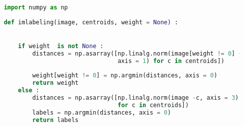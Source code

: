 	\lstset{style=python}
	\begin{lstlisting}[language=python, caption=imlabeling, label=code:imlabeling]
		
	import numpy as np
	
	def imlabeling(image, centroids, weight = None) :


		if weight  is not None :
			distances = np.asarray([np.linalg.norm(image[weight != 0] -c, 
									axis = 1) for c in centroids])
		
			weight[weight != 0] = np.argmin(distances, axis = 0)
			return weight
		else :
			distances = np.asarray([np.linalg.norm(image -c, axis = 3) 
									for c in centroids])
			labels = np.argmin(distances, axis = 0)
			return labels
	
	
	\end{lstlisting}
	



	
	
